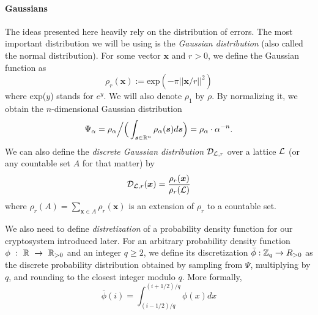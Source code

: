 \paragraph{Gaussians}
The ideas presented here heavily rely on the distribution of errors. The most important distribution we will be using is the \textit{Gaussian distribution} (also called the normal distribution). For some vector $\bm{x}$ and $r>0$, we define the Gaussian function as
\[ \rho_r (\bm{x}) := \text{exp}(- \pi ||\bm{x}/r||^2) \]
where exp($y$) stands for $e^y$. We will also denote $\rho_1$ by $\rho$. By normalizing it, we obtain the $n$-dimensional Gaussian distribution
\[\Psi_{\alpha} = \rho_{\alpha} \Big/ \Big( \int_{\boldsymbol{s} \in \mathbb{R}^n} \rho_{\alpha}(\boldsymbol{s}) d\boldsymbol{s} \Big) = \rho_{\alpha} \cdot \alpha^{-n}. \]
We can also define the \textit{discrete Gaussian distribution} $\mathcal{D}_{\mathcal{L}, r}$ over a lattice $\mathcal{L}$ (or any countable set $A$ for that matter) by
\begin{equation} \mathcal{D}_{\mathcal{L}, r}(\boldsymbol{x}) = \frac{\rho_r(\boldsymbol{x})}{\rho_r(\mathcal{L})} \end{equation}
where $\rho_r(A) = \sum_{\bm{x} \in A} \rho_r(\bm{x})$ is an extension of $\rho_r$ to a countable set.

\iffalse
\krzys{i dont think ill include this part about Psi beta at all}
In order to avoid making our proofs depend on the specific choice of modulus $q$, we now define the family of Gaussian distributions over $\T = \R/\Z = [0,1)$ - a periodization of the normal distribution. More specifically, following \cite{regev}, for $\beta \in \R_{> 0}$ define $\Psi_{\beta}$ as the distribution on $\T$ obtained by sampling from a normal variable with mean 0 and standard deviation $\frac{\beta}{\sqrt{2\pi}}$ and reducing the result modulo 1,
\begin{equation} \forall r \in [0,1), \Psi_{\beta}(r) := \sum_{k = -\infty}^{\infty} \frac{1}{\beta} \cdot \text{exp} \bigg(- \pi \Big(\frac{r-k}{\beta}\Big)^2\bigg). \end{equation}
\krzys{also, it turns out, that for whatever value of $r$ we pick, the result of that sum is always $|\beta|/\beta = 1$?????}
We will, for the sake of clearer notation, be a bit vague about the doman of $\Psi_{\beta}$. This is because sampling from $\Psi_{\beta}$ with parameter $\beta$, that is defined over $\T = [0,1)$ is equivalent to sampling from $\Psi_{q \beta}$ over $\Z_q$. \krzys{i am very hesitant about this statement - need to check if thats true}
\fi

We also need to define \textit{distretization} of a probability density function for our cryptosystem introduced later. For an arbitrary probability density function $\phi~:~\mathbb{R}~\to~\mathbb{R}_{>0}$ and an integer $q \geq 2$, we define its discretization $\bar{\phi} : \mathbb{Z}_q \rightarrow R_{>0}$ as the discrete probability distribution obtained by sampling from $\Psi$, multiplying by $q$, and rounding to the closest integer modulo $q$. More formally,
\begin{equation} \bar{\phi}(i) = \int_{(i -1/2)/q}^{(i + 1/2)/q} \phi(x) dx \end{equation}


